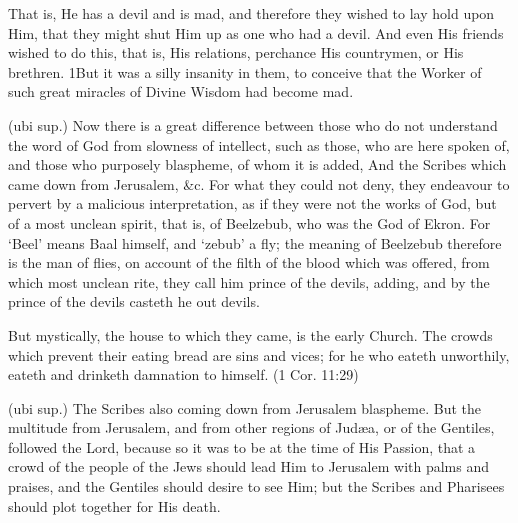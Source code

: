  That is, He has a devil and is mad, and therefore they wished to lay hold upon Him, that they might shut Him up as one who had a devil. And even His friends wished to do this, that is, His relations, perchance His countrymen, or His brethren. 1But it was a silly insanity in them, to conceive that the Worker of such great miracles of Divine Wisdom had become mad.

 (ubi sup.) Now there is a great difference between those who do not understand the word of God from slowness of intellect, such as those, who are here spoken of, and those who purposely blaspheme, of whom it is added, And the Scribes which came down from Jerusalem, \&c. For what they could not deny, they endeavour to pervert by a malicious interpretation, as if they were not the works of God, but of a most unclean spirit, that is, of Beelzebub, who was the God of Ekron. For ‘Beel’ means Baal himself, and ‘zebub’ a fly; the meaning of Beelzebub therefore is the man of flies, on account of the filth of the blood which was offered, from which most unclean rite, they call him prince of the devils, adding, and by the prince of the devils casteth he out devils.

 But mystically, the house to which they came, is the early Church. The crowds which prevent their eating bread are sins and vices; for he who eateth unworthily, eateth and drinketh damnation to himself. (1 Cor. 11:29)

 (ubi sup.) The Scribes also coming down from Jerusalem blaspheme. But the multitude from Jerusalem, and from other regions of Judæa, or of the Gentiles, followed the Lord, because so it was to be at the time of His Passion, that a crowd of the people of the Jews should lead Him to Jerusalem with palms and praises, and the Gentiles should desire to see Him; but the Scribes and Pharisees should plot together for His death.

 

